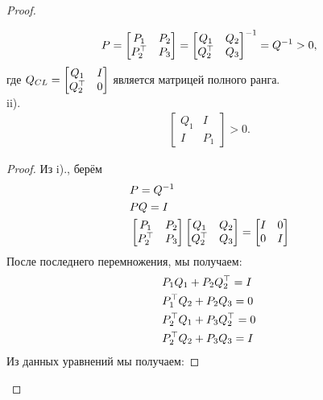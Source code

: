 \begin{proof}
\begin{lemma}
	\begin{align*}
		{P}=
		\begin{bmatrix} 
			{P}_{1} & {P}_{2}\\ 
			{P}_{2}^\top & {P}_{3} 
		\end{bmatrix} =
		\begin{bmatrix} 
			{Q}_{1} & {Q}_{2} \\ 
			{Q}_{2}^\top & {Q}_{3}
		\end{bmatrix}^{-1}={Q}^{-1}>0,
	\end{align*} 
	где ${Q}_{CL}=
	\begin{bmatrix} 
		{Q}_{1} & {I} \\ {Q}_{2}^\top & 0
	\end{bmatrix}$ является матрицей полного ранга.\\
	
	ii). \begin{align*}
		\begin{bmatrix} 
			{Q}_{1} & I \\ 
			I & {P}_{1}
		\end{bmatrix} > 0.
	\end{align*}
\end{lemma}
\begin{proof}
	Из i)., берём 
	\begin{align}
		&{P} = {Q}^{-1}\\
		&{P}{Q}={I}\\
		&\begin{bmatrix} 
			{P}_{1} & {P}_{2}\\ 
			{P}_{2}^\top & {P}_{3} 
		\end{bmatrix}
		\begin{bmatrix} 
			{Q}_{1} & {Q}_{2} \\ 
			{Q}_{2}^\top & {Q}_{3}
		\end{bmatrix} = 
		\begin{bmatrix}
			{I} & 0 \\
			0 & {I}
		\end{bmatrix}
	\end{align}
	После последнего перемножения, мы получаем:
	\begin{align}
		&{P}_{1}{Q}_{1}+{P}_{2}{Q}_{2}^\top ={I}\\
		&{P}_{1}^\top{Q}_{2}+{P}_{2}{Q}_{3} =0\label{eq: lemma mult1}\\
		&{P}_{2}^\top{Q}_{1}+{P}_{3}{Q}_{2}^\top=0\\
		&{P}_{2}^\top{Q}_{2}+{P}_{3}{Q}_{3}= {I} \label{eq: lemma mult2}
	\end{align}
	Из данных уравнений мы получаем:

\end{proof}
\end{proof}
